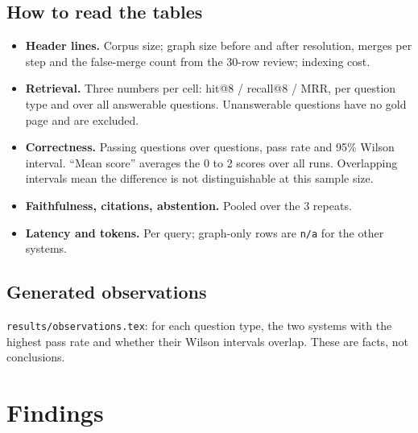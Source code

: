 \documentclass[11pt,a4paper]{article}
\newcommand{\code}[1]{\texttt{#1}}
\begin{document}
\medskip
\noindent{}

\subsection*{How to read the tables}
\begin{itemize}
  \item \textbf{Header lines.} Corpus size; graph size before and after resolution, merges per
  step and the false-merge count from the 30-row review; indexing cost.
  \item \textbf{Retrieval.} Three numbers per cell: hit@8 / recall@8 / MRR, per question type and
  over all answerable questions. Unanswerable questions have no gold page and are excluded.
  \item \textbf{Correctness.} Passing questions over questions, pass rate and 95\% Wilson
  interval. ``Mean score'' averages the 0 to 2 scores over all runs. Overlapping intervals mean
  the difference is not distinguishable at this sample size.
  \item \textbf{Faithfulness, citations, abstention.} Pooled over the 3 repeats.
  \item \textbf{Latency and tokens.} Per query; graph-only rows are \code{n/a} for the other
  systems.
\end{itemize}

{\small\setlength{\tabcolsep}{4pt}
}

\subsection*{Generated observations}

\code{results/observations.tex}: for each question type, the two systems with the highest pass
rate and whether their Wilson intervals overlap. These are facts, not conclusions.



\section{Findings}
\label{sec:findings}
\end{document}
